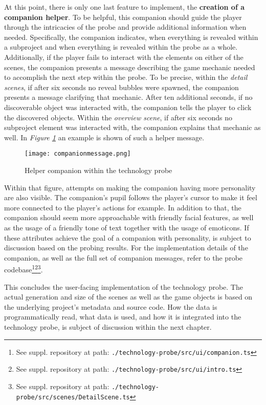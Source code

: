 At this point, there is only one last feature to implement, the \textbf{creation of a companion helper}. To be helpful, this companion should guide the player through the intricacies of the probe and provide additional information when needed. Specifically, the companion indicates, when everything is revealed within a subproject and when everything is revealed within the probe as a whole. Additionally, if the player fails to interact with the elements on either of the scenes, the companion presents a message describing the game mechanic needed to accomplish the next step within the probe. To be precise, within the \textit{detail scenes}, if after six seconds no reveal bubbles were spawned, the companion presents a message clarifying that mechanic. After ten additional seconds, if no discoverable object was interacted with, the companion tells the player to click the discovered objects. Within the \textit{overview scene}, if after six seconds no subproject element was interacted with, the companion explains that mechanic as well. In \textit{Figure \ref{fig:companion}} an example is shown of such a helper message.

\begin{figure}[h]
  \centering
  \texttt{[image: companionmessage.png]}
  \caption{Helper companion within the technology probe}
  \label{fig:companion}
\end{figure}

Within that figure, attempts on making the companion having more personality are also visible. The companion's pupil follows the player's cursor to make it feel more connected to the player's actions for example. In addition to that, the companion should seem more approachable with friendly facial features, as well as the usage of a friendly tone of text together with the usage of emoticons. If these attributes achieve the goal of a companion with personality, is subject to discussion based on the probing results. For the implementation details of the companion, as well as the full set of companion messages, refer to the probe codebase\footnote{See suppl. repository at path: \texttt{./technology-probe/src/ui/companion.ts}}\footnote{See suppl. repository at path: \texttt{./technology-probe/src/ui/intro.ts}}\footnote{See suppl. repository at path: \texttt{./technology-probe/src/scenes/DetailScene.ts}}.

This concludes the user-facing implementation of the technology probe. The actual generation and size of the scenes as well as the game objects is based on the underlying project's metadata and source code. How the data is programmatically read, what data is used, and how it is integrated into the technology probe, is subject of discussion within the next chapter.

